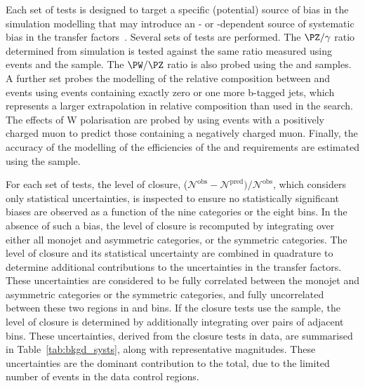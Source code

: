Each set of tests is designed to target a specific (potential) source
of bias in the simulation modelling that may introduce an \njet- or
\scalht-dependent source of systematic bias in the transfer
factors~\cite{RA1Paper2012}. Several sets of tests are performed. The
$\PZ/\gamma$ ratio determined from simulation is tested against the
same ratio measured using \zmumuj events and the \gj sample. The
$\PW/\PZ$ ratio is also probed using the \mj and \mmj samples. A
further set probes the modelling of the relative composition between
\wlj and \ttbar events using \mj events containing exactly zero or
one more b-tagged jets, which represents a larger extrapolation in
relative composition than used in the search.  The effects of W
polarisation are probed by using \mj events with a positively charged
muon to predict those containing a negatively charged muon. Finally,
the accuracy of the modelling of the efficiencies of the \alphat and
\bdphi requirements are estimated using the \mj sample.

For each set of tests, the level of closure, %
($\mathcal{N}^\text{obs} - \mathcal{N}^\text{pred}) /
\mathcal{N}^\text{obs}$, which considers only statistical
uncertainties, is inspected to ensure no statistically significant
biases are observed as a function of the nine \njet categories or the
eight \scalht bins. In the absence of such a bias, the level of
closure is recomputed by integrating over either all monojet and
asymmetric \njet categories, or the symmetric \njet categories. The
level of closure and its statistical uncertainty are combined in
quadrature to determine additional contributions to the uncertainties
in the transfer factors. These uncertainties are considered to be
fully correlated between the monojet and asymmetric \njet categories
or the symmetric \njet categories, and fully uncorrelated between
these two regions in \njet and \scalht bins. If the closure tests use
the \mmj sample, the level of closure is determined by additionally
integrating over pairs of adjacent \scalht bins. These uncertainties,
derived from the closure tests in data, are summarised in
Table~\ref{tab:bkgd_systs}, along with representative
magnitudes. These uncertainties are the dominant contribution to the
total, due to the limited number of events in the data control
regions.




